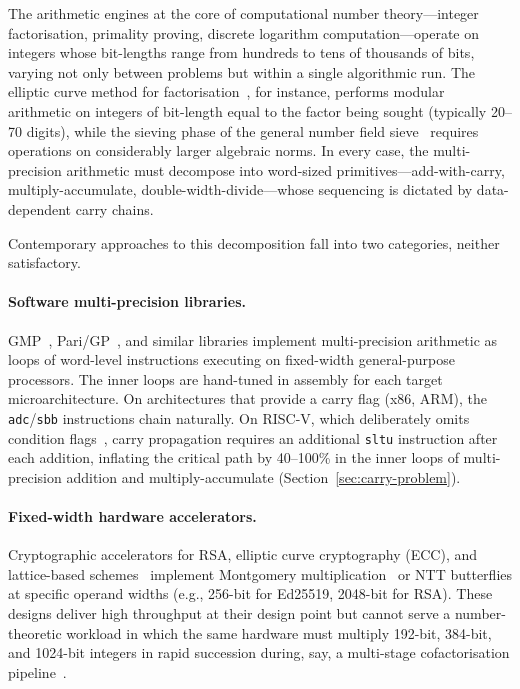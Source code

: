 \documentclass[11pt,a4paper]{article}
\begin{document}
The arithmetic engines at the core of computational number theory---integer
factorisation, primality proving, discrete logarithm computation---operate on
integers whose bit-lengths range from hundreds to tens of thousands of bits,
varying not only between problems but within a single algorithmic run.  The
elliptic curve method for factorisation~\cite{lenstra1987}, for instance,
performs modular arithmetic on integers of bit-length equal to the factor being
sought (typically 20--70 digits), while the sieving phase of the general number
field sieve~\cite{lenstra1993gnfs} requires operations on considerably larger
algebraic norms.  In every case, the multi-precision arithmetic must decompose
into word-sized primitives---add-with-carry, multiply-accumulate,
double-width-divide---whose sequencing is dictated by data-dependent carry
chains.

Contemporary approaches to this decomposition fall into two categories, neither
satisfactory.

\paragraph{Software multi-precision libraries.}
GMP~\cite{gmp2023}, Pari/GP~\cite{parigp2024}, and similar libraries implement
multi-precision arithmetic as loops of word-level instructions executing on
fixed-width general-purpose processors.  The inner loops are hand-tuned in
assembly for each target microarchitecture.  On architectures that provide a
carry flag (x86, ARM), the \texttt{adc}/\texttt{sbb} instructions chain
naturally.  On RISC-V, which deliberately omits condition flags~\cite{riscvisa2019},
carry propagation requires an additional \texttt{sltu} instruction after each
addition, inflating the critical path by 40--100\% in the inner loops of
multi-precision addition and multiply-accumulate (Section~\ref{sec:carry-problem}).

\paragraph{Fixed-width hardware accelerators.}
Cryptographic accelerators for RSA, elliptic curve cryptography (ECC), and
lattice-based schemes~\cite{wang2013,ducas2018} implement Montgomery
multiplication~\cite{montgomery1985} or NTT butterflies at specific operand
widths (e.g., 256-bit for Ed25519, 2048-bit for RSA).  These designs deliver
high throughput at their design point but cannot serve a number-theoretic
workload in which the same hardware must multiply 192-bit, 384-bit, and
1024-bit integers in rapid succession during, say, a multi-stage cofactorisation
pipeline~\cite{miele2014}.
\end{document}
